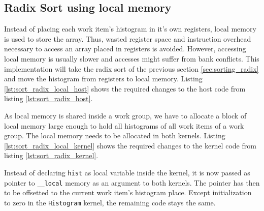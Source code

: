 \subsection{Radix Sort using local memory}
\label{sec:sorting_radix_local}

Instead of placing each work item's histogram in it's own registers, local memory is used to store the array. Thus, wasted register space and instruction overhead necessary to access an array placed in registers is avoided. However, accessing local memory is usually slower and accesses might suffer from bank conflicts. This implementation will take the radix sort of the previous section \ref{sec:sorting_radix} and move the histogram from registers to local memory.
Listing \ref{lst:sort_radix_local_host} shows the required changes to the host code from listing \ref{lst:sort_radix_host}.



As local memory is shared inside a work group, we have to allocate a block of local memory large enough to hold all histograms of all work items of a work group. The local memory needs to be allocated in both kernels.
Listing \ref{lst:sort_radix_local_kernel} shows the required changes to the kernel code from listing \ref{lst:sort_radix_kernel}.



Instead of declaring \lstinline!hist! as local variable inside the kernel, it is now passed as pointer to \lstinline!__local! memory as an argument to both kernels. The pointer has then to be offsetted to the current work item's histogram place. Except initialization to zero in the \lstinline!Histogram! kernel, the remaining code stays the same.


